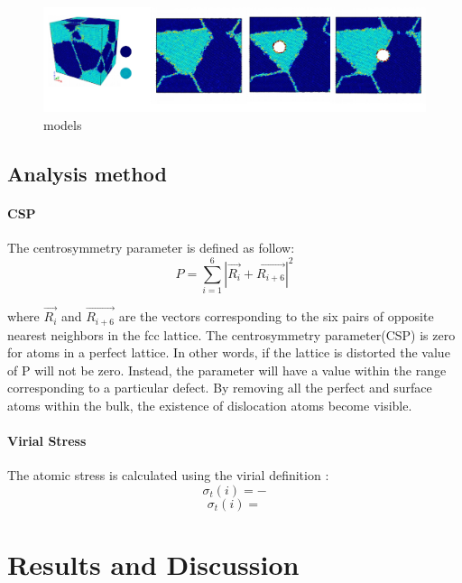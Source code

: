\documentclass[final,5pt,times]{elsarticle}
\begin{document}
	\begin{figure}[h]
		\centering
		\includegraphics[width=1\linewidth]{img/models}
		\caption{models}
		\label{fig:simulation_box}
	\end{figure}
	
	\subsection{Analysis method}
	\paragraph{CSP}
	The centrosymmetry parameter is defined as follow:
	\begin{equation} \label{eq:csp} 
	P = \displaystyle\sum_{i=1}^{6}|\vec{R_i}+\vec{R_{i+6}}|^2
	\end{equation}
	
	where $\vec{R_i}$ and $\vec{R_{i+6}}$ are the vectors corresponding to the six pairs of opposite nearest neighbors in the fcc lattice. The centrosymmetry parameter(CSP) is zero for atoms in a perfect lattice. In other words, if the lattice is distorted the value of P will not be zero. Instead, the parameter will have a value within the range corresponding to a particular defect. By removing all the perfect and surface atoms within the bulk, the existence of dislocation atoms become visible.
	
	\paragraph{Virial Stress}
	The atomic stress is calculated using the virial definition :
	$$\sigma_t(i)=-$$
	$$\sigma_t(i)= $$
	
	\section{Results and Discussion}
	
\end{document}
